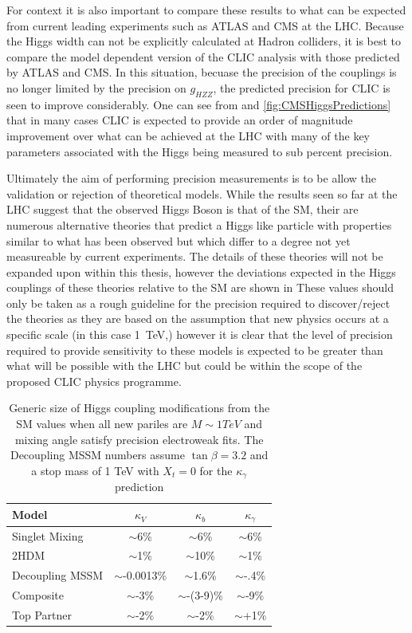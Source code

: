 For context it is also important to compare these results to what can be expected from current leading experiments such as ATLAS and CMS at the LHC. Because the Higgs width can not be explicitly calculated at Hadron colliders, it is best to compare the model dependent version of the CLIC analysis with those predicted by ATLAS and CMS. In this situation, becuase the precision of the couplings is no longer limited by the precision on $g_{HZZ}$, the predicted precision for CLIC is seen to improve considerably. One can see from  and \ref{fig:CMSHiggsPredictions} that in many cases CLIC is expected to provide an order of magnitude improvement over what can be achieved at the LHC with many of the key parameters associated with the Higgs being measured to sub percent precision.

Ultimately the aim of performing precision measurements is to be allow the validation or rejection of theoretical models. While the results seen so far at the LHC suggest that the observed Higgs Boson is that of the \ac{SM}, their are numerous alternative theories that predict a Higgs like particle with properties similar to what has been observed but which differ to a degree not yet measureable by current experiments. The details of these theories will not be expanded upon within this thesis, however the deviations expected in the Higgs couplings of these theories relative to the \ac{SM} are shown in  These values should only be taken as a rough guideline for the precision required to discover/reject the theories as they are based on the assumption that new physics occurs at a specific scale (in this case 1~TeV,) however it is clear that the level of precision required to provide sensitivity to these models is expected to be greater than what will be possible with the LHC but could be within the scope of the proposed CLIC physics programme.  

\begin{table}
  \centering
  \begin{tabular}{l c c c}
    \toprule
    \toprule
    Model  & $\kappa_V$ & $\kappa_b$ & $\kappa_\gamma$  \\
    \midrule
    Singlet Mixing & $\sim$6\% & $\sim$6\%  & $\sim$6\% \\
    2HDM & $\sim$1\% & $\sim$10\%  & $\sim$1\% \\
    Decoupling MSSM & $\sim$-0.0013\% & $\sim$1.6\%  & $\sim$-.4\% \\
    Composite & $\sim$-3\% & $\sim$-(3-9)\%  & $\sim$-9\% \\
    Top Partner & $\sim$-2\% & $\sim$-2\%  & $\sim$+1\% \\
    \bottomrule
    \bottomrule
  \end{tabular}
  \caption{Generic size of Higgs coupling modifications from the \ac{SM} values when all new pariles are $M\sim 1 TeV$ and mixing angle satisfy precision electroweak fits. The Decoupling MSSM numbers assume $\tan\beta = 3.2$ and a stop mass of 1 TeV with $X_t =0$ for the $\kappa_\gamma$ prediction \cite{Dawson:2013bba}}
  \label{table:snowmass}
\end{table}

